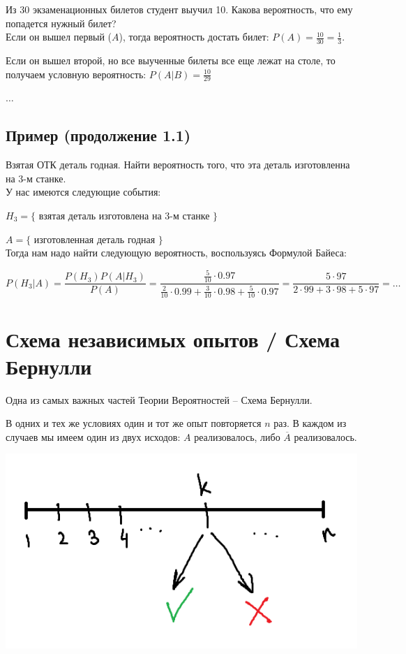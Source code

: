 \documentclass{article}
\begin{document}
Из 30 экзаменационных билетов студент выучил 10. Какова вероятность, что ему попадется нужный билет?
\\

Если он вышел первый ($A$), тогда вероятность достать билет: $P(A) = \frac{10}{30} = \frac{1}{3}$.

Если он вышел второй, но все выученные билеты все еще лежат на столе, то получаем условную вероятность: $P(A|B) = \frac{10}{29}$

$\ldots$

\subsection{Пример (продолжение 1.1)}

Взятая ОТК деталь годная. Найти вероятность того, что эта деталь изготовленна на 3-м станке.
\\

У нас имеются следующие события:

$H_3 = \{$ взятая деталь изготовлена на 3-м станке $\}$

$A = \{$ изготовленная деталь годная $\}$
\\

Тогда нам надо найти следующую вероятность, воспользуясь Формулой Байеса:

$$ P(H_3 | A) = \frac{P(H_3)P(A|H_3)}{P(A)} =
\frac{\frac{5}{10} \cdot 0.97}{\frac{2}{10} \cdot 0.99 +  \frac{3}{10} \cdot 0.98 +  \frac{5}{10} \cdot 0.97} = \frac{5 \cdot 97}{2 \cdot 99 + 3 \cdot 98 + 5 \cdot 97} = \ldots$$

\section{Схема независимых опытов / Схема Бернулли}

Одна из самых важных частей Теории Вероятностей -- Схема Бернулли.

В одних и тех же условиях один и тот же опыт повторяется $n$ раз. В каждом из случаев мы имеем один из двух исходов: $A$ реализовалось, либо $\overline{A}$ реализовалось.

\begin{center}
    \includegraphics[scale=0.6]{2.png}
\end{center}
\end{document}
